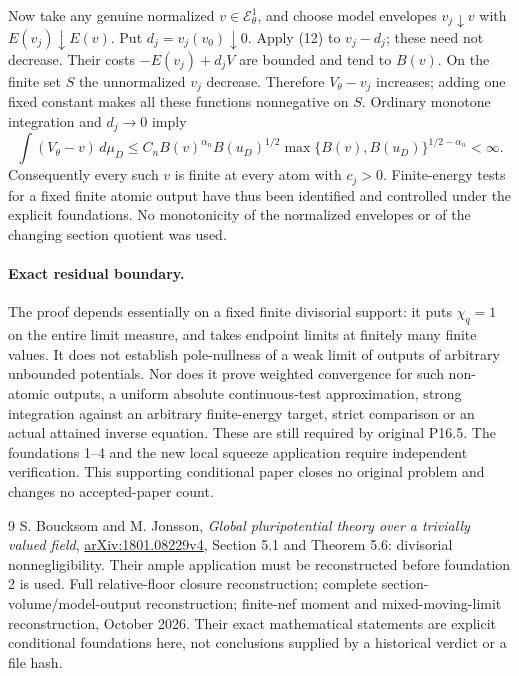\documentclass[10pt]{article}
\begin{document}
Now take any genuine normalized $v\in\mathcal E^1_\theta$, and choose
model envelopes $v_j\downarrow v$ with $E(v_j)\downarrow E(v)$.
Put $d_j=v_j(v_0)\downarrow0$. Apply (12) to $v_j-d_j$; these need
not decrease. Their costs $-E(v_j)+d_jV$ are bounded and tend to $B(v)$.
On the finite set $S$ the unnormalized $v_j$ decrease. Therefore
$V_\theta-v_j$ increases; adding one fixed constant makes all these
functions nonnegative on $S$. Ordinary monotone integration and
$d_j\to0$ imply
\[
 \int(V_\theta-v)\,d\mu_D
 \le C_n B(v)^{\alpha_n}B(u_D)^{1/2}
                    \max\{B(v),B(u_D)\}^{1/2-\alpha_n}<\infty.
 \tag{13}
\]
Consequently every such $v$ is finite at every atom with $c_j>0$.
Finite-energy tests for a fixed finite atomic output have thus been
identified and controlled under the explicit foundations. No monotonicity
of the normalized envelopes or of the changing section quotient was used.

\paragraph{Exact residual boundary.}
The proof depends essentially on a fixed finite divisorial support:
it puts $\chi_q=1$ on the entire limit measure, and takes endpoint limits
at finitely many finite values. It does not establish pole-nullness of a
weak limit of outputs of arbitrary unbounded potentials. Nor does it
prove weighted convergence for such non-atomic outputs, a uniform
absolute continuous-test approximation, strong integration against an
arbitrary finite-energy target, strict comparison or an actual attained
inverse equation. These are still required by original P16.5.
The foundations 1--4 and the new local squeeze application require
independent verification. This supporting conditional paper closes no
original problem and changes no accepted-paper count.

\begin{thebibliography}{9}
 S. Boucksom and M. Jonsson,
\emph{Global pluripotential theory over a trivially valued field},
\href{https://arxiv.org/pdf/1801.08229v4}{arXiv:1801.08229v4},
Section 5.1 and Theorem 5.6: divisorial nonnegligibility. Their ample
application must be reconstructed before foundation 2 is used.
 Full relative-floor closure reconstruction;
complete section-volume/model-output reconstruction; finite-nef moment
and mixed-moving-limit reconstruction, October 2026. Their exact
mathematical statements are explicit conditional foundations here,
not conclusions supplied by a historical verdict or a file hash.
\end{thebibliography}
\end{document}
